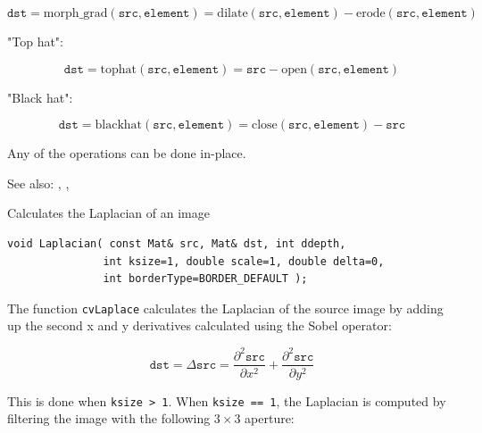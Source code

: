 \[
\texttt{dst}=\mathrm{morph\_grad}(\texttt{src},\texttt{element})=\mathrm{dilate}(\texttt{src},\texttt{element})-\mathrm{erode}(\texttt{src},\texttt{element})
\]

"Top hat":

\[
\texttt{dst}=\mathrm{tophat}(\texttt{src},\texttt{element})=\texttt{src}-\mathrm{open}(\texttt{src},\texttt{element})
\]

"Black hat":

\[
\texttt{dst}=\mathrm{blackhat}(\texttt{src},\texttt{element})=\mathrm{close}(\texttt{src},\texttt{element})-\texttt{src}
\]

Any of the operations can be done in-place.

See also: , , 

\label{Laplacian}
Calculates the Laplacian of an image

\begin{lstlisting}
void Laplacian( const Mat& src, Mat& dst, int ddepth,
               int ksize=1, double scale=1, double delta=0,
               int borderType=BORDER_DEFAULT );
\end{lstlisting}
\begin{description}
\end{description}

The function \texttt{cvLaplace} calculates the Laplacian of the source image by adding up the second x and y derivatives calculated using the Sobel operator:

\[
\texttt{dst} = \Delta \texttt{src} = \frac{\partial^2 \texttt{src}}{\partial x^2} + \frac{\partial^2 \texttt{src}}{\partial y^2}
\]


This is done when \texttt{ksize > 1}. When \texttt{ksize == 1}, the Laplacian is computed by filtering the image with the following $3 \times 3$ aperture:

